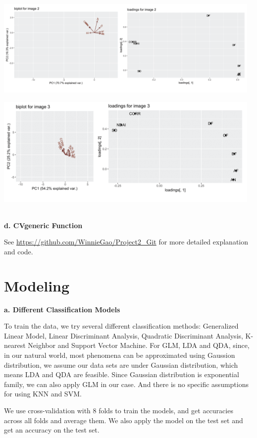 \documentclass[11pt]{article}
\begin{document}
\includegraphics[width = 13cm]{2(c)pca2.png}

\includegraphics[width = 13cm]{2(c)pca3.png}

\vspace{0.3cm}
\mbox{}\\
\textbf{d. CVgeneric Function}

See \url{https://github.com/WinnieGao/Project2_Git} for more detailed explanation and code.



\section{Modeling}

\vspace{0.2cm}
\textbf{a. Different Classification Models}

To train the data, we try several different classification methods: Generalized Linear Model, Linear Discriminant Analysis, Quadratic Discriminant Analysis, K-nearest Neighbor and Support Vector Machine.
For GLM, LDA and QDA, since, in our natural world, most phenomena can be approximated using Gaussion distribution, we assume our data sets are under Gaussian distribution, which means LDA and QDA are feasible. Since Gaussian distribution is exponential family, we can also apply GLM in our case. And there is no specific assumptions for using KNN and SVM.

We use cross-validation with 8 folds to train the models, and get accuracies across all folds and average them. We also apply the model on the test set and get an accuracy on the test set.
\end{document}

